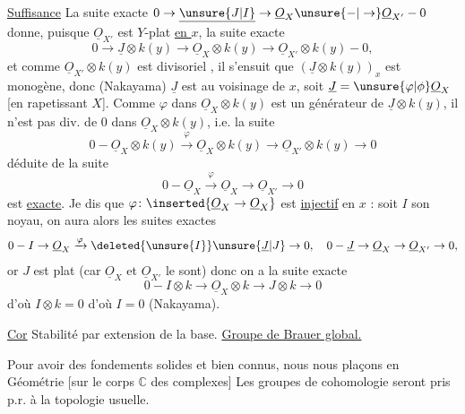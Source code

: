 \uline{Suffisance} La suite exacte $0\to\underline{\unsure{J|I}}\to\underline{O}_X\unsure{-|\to}\underline{O}_{X'}-0$ donne, puisque $\underline{O}_{X'}$ est $Y$-plat \uline{en $x$}, la suite exacte
\[
0\to\underline{J}\otimes k(y)\to\underline{O}_X\otimes k(y)\to\underline{O}_{X'}\otimes k(y)-0,
\]
et comme $\underline{O}_{X'}\otimes k(y)$ est divisoriel , il s'ensuit que $(\underline{J}\otimes k(y))_x$ est monogène, donc (Nakayama) $\underline{J}$  est   au voisinage de $x$, soit $\underline{J}=\unsure{\varphi|\phi}\underline{O}_X$ [en rapetissant $X$]. Comme $\varphi$ dans $\underline{O}_X\otimes k(y)$ est un générateur de $\underline{J}\otimes k(y)$, il n'est pas div. de $0$ dans $\underline{O}_X\otimes k(y)$, i.e. la suite
\[
0-\underline{O}_X\otimes k(y)\xrightarrow{\varphi}\underline{O}_X\otimes k(y)\to\underline{O}_{X'}\otimes k(y)\to0
\]
déduite de la suite
\[
0-\underline{O}_X\xrightarrow{\varphi}\underline{O}_X\to\underline{O}_{X'}\to0
\]
est \uline{exacte}. Je dis que $\varphi\colon\inserted{\underline{O}_X\to\underline{O}_X}$ est \uline{injectif} en $x$ : soit $I$ son noyau, on aura alors les suites exactes
\[
0-I\to\underline{O}_X\xrightarrow{\varphi}\deleted{\unsure{I}}\unsure{\underline{J}|J}\to0,\quad 0-\underline{J}\to\underline{O}_X\to\underline{O}_{X'}\to0,
\]
or $J$ est plat (car $\underline{O}_X$ et $\underline{O}_{X'}$ le sont) donc on a la suite exacte
\[
0-I\otimes k\to\underline{O}_X\otimes k\to J\otimes k\to0
\]
d'où $I\otimes k=0$ d'où $I=0$ (Nakayama). 

\uline{Cor} Stabilité par extension de la base.
\uline{Groupe de Brauer global.}

Pour avoir des fondements solides et bien connus, nous nous plaçons en Géométrie   [sur le corps $\mathbb{C}$ des complexes] Les groupes de cohomologie seront pris p.r. à la topologie usuelle.

